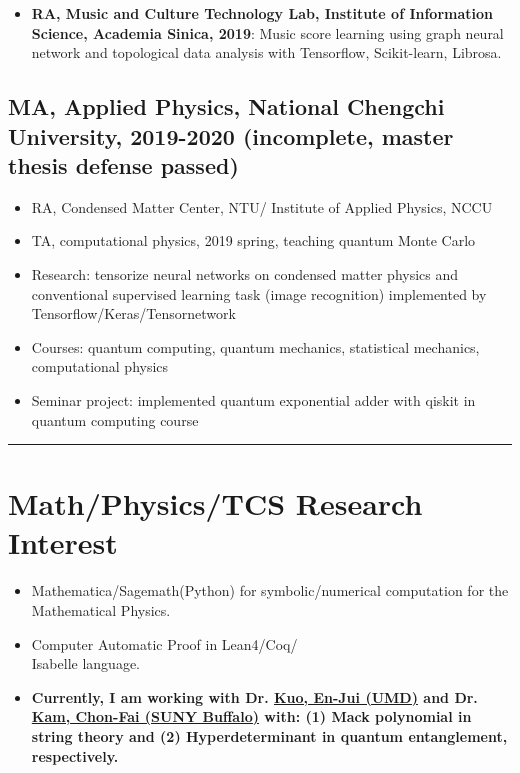 \documentclass[11pt]{article}
\begin{document}
\begin{multicols*}{2}
\begin{itemize}[noitemsep]
        \item \textbf{RA, Music and Culture Technology Lab, Institute of Information Science, Academia Sinica, 2019}: Music score learning using graph neural network and topological data analysis with Tensorflow, Scikit-learn, Librosa.
        
    \end{itemize}

\subsection*{MA, Applied Physics, National Chengchi University, 2019-2020 (incomplete, master thesis defense passed)}

    \begin{itemize}[noitemsep]
        \item RA, Condensed Matter Center, NTU/ Institute of Applied Physics, NCCU
        \item TA, computational physics, 2019 spring, teaching quantum Monte Carlo
        \item Research: tensorize neural networks on condensed matter physics and conventional supervised learning task (image recognition) implemented by Tensorflow/Keras/Tensornetwork
        \item Courses: quantum computing, quantum mechanics, statistical mechanics, computational physics
        \item Seminar project: implemented quantum exponential adder with qiskit in quantum computing course 
    \end{itemize}

\hrule

\section*{Math/Physics/TCS Research Interest}
\begin{itemize}[noitemsep]
    \item Mathematica/Sagemath(Python) for symbolic/numerical computation for the Mathematical Physics.
    \item Computer Automatic Proof in Lean4/Coq/\\Isabelle language.  
    \item \textbf{ Currently, I am working with Dr. \href{https://www.bing.com/search?q=en-jui+kuo&gs_lcrp=EgZjaHJvbWUqBggBEEUYOzIGCAAQRRg5MgYIARBFGDsyBggCEEUYOzIGCAMQRRg7MgYIBBAAGEAyBggFEAAYQDIGCAYQRRg9MgYIBxBFGDwyBggIEEUYPNIBCDE2NjVqMGoxqAIAsAIA&FORM=ANAB01&PC=HCTS}{Kuo, En-Jui (UMD)} and Dr. \href{https://scholar.google.com.hk/citations?user=38TPAxMAAAAJ&hl=en}{Kam, Chon-Fai (SUNY Buffalo)} with: (1) Mack polynomial in string theory and (2) Hyperdeterminant in quantum entanglement, respectively. }
\end{itemize}


\end{multicols*}
\end{document}
